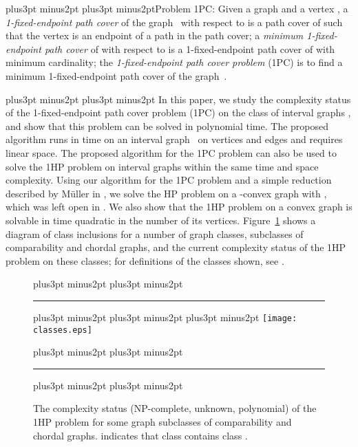 \documentclass[10pt]{article}
\def\yskip{\penalty-50\vskip3pt plus3pt minus2pt}
\def\y{\yskip}
\def\yy{\yskip\yskip}
\begin{document}
\yy\noindent Problem 1PC: Given a graph  and a vertex , a {\it 1-fixed-endpoint path cover} of the graph~ with
respect to  is a path cover of  such that the vertex  is
an endpoint of a path in the path cover; a {\it minimum
1-fixed-endpoint path cover} of  with respect to  is a
1-fixed-endpoint path cover of  with minimum cardinality; the
{\it 1-fixed-endpoint path cover problem} (1PC) is to find a
minimum 1-fixed-endpoint path cover of the graph~.

\yy{} In this paper, we study the
complexity status of the 1-fixed-endpoint path cover problem (1PC)
on the class of interval graphs \cite{BraLeSpi, Gol}, and show
that this problem can be solved in polynomial time. The proposed
algorithm runs in  time on an interval graph~ on 
vertices and  edges and requires linear space. The proposed
algorithm for the 1PC problem can also be used to solve the 1HP
problem on interval graphs within the same time and space
complexity. Using our algorithm for the 1PC problem and a simple
reduction described by M\"{u}ller in \cite{Muller}, we solve the
HP problem on a -convex graph  with ,
which was left open in \cite{UeharaUno}. We also show that the 1HP
problem on a convex graph  is solvable in time quadratic in the
number of its vertices. Figure~\ref{class} shows a diagram of
class inclusions for a number of graph classes, subclasses of
comparability and chordal graphs, and the current complexity
status of the 1HP problem on these classes; for definitions of the
classes shown, see \cite{BraLeSpi, Gol}.

\begin{figure}[t]
\yy \hrule \y\y\y
  \centering
  \texttt{[image: classes.eps]}
  \centering
  \caption{\small{The complexity status (NP-complete, unknown, polynomial) of the 1HP problem for some graph subclasses of comparability and chordal graphs.  indicates that
  class  contains class .}}
  \label{class}
 \yy \hrule \y\y
\end{figure}
\end{document}
